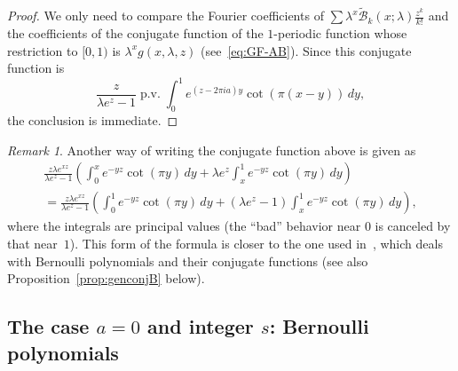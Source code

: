 \documentclass[11pt,a4paper,reqno]{amsart}
\newcommand{\B}{\mathcal{B}}
\let\tilde\widetilde
\newcommand{\pv}{\operatorname{p.v.}}
\theoremstyle{plain}
\theoremstyle{remark}
\newtheorem{remark}{Remark}
\numberwithin{equation}{section}
\begin{document}
\begin{proof}
We only need to compare the Fourier coefficients of $\sum \lambda^x \tilde{\B}_k(x;\lambda) \frac{z^k}{k!}$ and the coefficients of the conjugate function of the $1$-periodic function whose restriction to $[0,1)$ is $\lambda^x g(x,\lambda,z)$ (see~\eqref{eq:GF-AB}). Since this conjugate function is
\begin{equation*}
  \frac{z}{\lambda e^z -1} \pv \int_{0}^1 e^{(z-2\pi ia)y} \cot(\pi(x- y))\,dy,
\end{equation*}
the conclusion is immediate.
\end{proof}

\begin{remark}
Another way of writing the conjugate function above is given as
\begin{multline*}
  \frac{z\lambda e^{xz}}{\lambda e^z -1} \left(\int_0^x e^{-yz} \cot(\pi y)\,dy
  + \lambda e^z \int_x^1 e^{-yz}\cot(\pi y)\,dy\right)
  \\
  = \frac{z\lambda e^{xz}}{\lambda e^z -1}\left(\int_0^1 e^{-yz}\cot(\pi y)\,dy
  + (\lambda e^z-1) \int_x^1 e^{-yz}\cot(\pi y)\,dy\right),
\end{multline*}
where the integrals are principal values (the ``bad'' behavior near $0$ is canceled by that near~$1$). This form of the formula is closer to the one used in~\cite[\S\,7]{Ha}, which deals with Bernoulli polynomials and their conjugate functions (see also Proposition~\ref{prop:genconjB} below).
\end{remark}

\subsection{The case \texorpdfstring{$a=0$}{a=0} and integer \texorpdfstring{$s$}{s}: Bernoulli polynomials}
\label{subsec:Ber}
\end{document}

